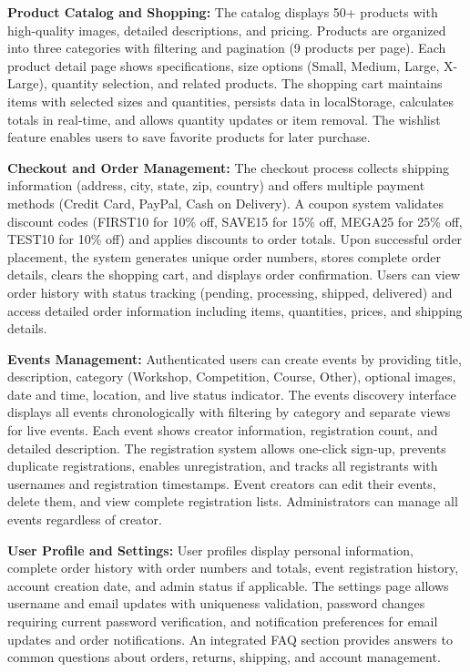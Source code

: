 ﻿\documentclass[11pt]{article}
\begin{document}
\textbf{Product Catalog and Shopping:} The catalog displays 50+ products with high-quality images, detailed descriptions, and pricing. Products are organized into three categories with filtering and pagination (9 products per page). Each product detail page shows specifications, size options (Small, Medium, Large, X-Large), quantity selection, and related products. The shopping cart maintains items with selected sizes and quantities, persists data in localStorage, calculates totals in real-time, and allows quantity updates or item removal. The wishlist feature enables users to save favorite products for later purchase.

\textbf{Checkout and Order Management:} The checkout process collects shipping information (address, city, state, zip, country) and offers multiple payment methods (Credit Card, PayPal, Cash on Delivery). A coupon system validates discount codes (FIRST10 for 10\% off, SAVE15 for 15\% off, MEGA25 for 25\% off, TEST10 for 10\% off) and applies discounts to order totals. Upon successful order placement, the system generates unique order numbers, stores complete order details, clears the shopping cart, and displays order confirmation. Users can view order history with status tracking (pending, processing, shipped, delivered) and access detailed order information including items, quantities, prices, and shipping details.

\textbf{Events Management:} Authenticated users can create events by providing title, description, category (Workshop, Competition, Course, Other), optional images, date and time, location, and live status indicator. The events discovery interface displays all events chronologically with filtering by category and separate views for live events. Each event shows creator information, registration count, and detailed description. The registration system allows one-click sign-up, prevents duplicate registrations, enables unregistration, and tracks all registrants with usernames and registration timestamps. Event creators can edit their events, delete them, and view complete registration lists. Administrators can manage all events regardless of creator.

\textbf{User Profile and Settings:} User profiles display personal information, complete order history with order numbers and totals, event registration history, account creation date, and admin status if applicable. The settings page allows username and email updates with uniqueness validation, password changes requiring current password verification, and notification preferences for email updates and order notifications. An integrated FAQ section provides answers to common questions about orders, returns, shipping, and account management.
\end{document}
